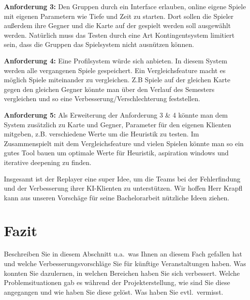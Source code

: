 \documentclass[12pt,a4paper,bibliography=totocnumbered,listof=totocnumbered]{scrartcl}
\begin{document}
	\textbf{Anforderung 3:} Den Gruppen durch ein Interface erlauben, online eigene Spiele mit eigenen Parametern wie Tiefe und Zeit zu starten. Dort sollen die Spieler außerdem ihre Gegner und die Karte auf der gespielt werden soll ausgewählt werden. Natürlich muss das Testen durch eine Art Kontingentsystem limitiert sein, dass die Gruppen das Spielsystem nicht ausnützen können. 
	
	\textbf{Anforderung 4:} Eine Profilsystem würde sich anbieten. In diesem System werden alle vergangenen Spiele gespeichert. Ein Vergleichsfeature macht es möglich Spiele miteinander zu vergleichen. Z.B Spiele auf der gleichen Karte gegen den gleichen Gegner könnte man über den Verlauf des Semesters vergleichen und so eine Verbesserung/Verschlechterung feststellen.
	
	\textbf{Anforderung 5:} Als Erweiterung der Anforderung 3 \& 4 könnte man dem System zusätzlich zu Karte und Gegner, Parameter für den eigenen Klienten mitgeben, z.B. verschiedene Werte um die Heuristik zu testen. Im Zusammenspielt mit dem Vergleichsfeature und vielen Spielen könnte man so ein gutes Tool bauen um optimale Werte für Heuristik, aspiration windows und iterative deepening zu finden.
	
	Insgesamt ist der Replayer eine super Idee, um die Teams bei der Fehlerfindung und der Verbesserung ihrer KI-Klienten zu unterstützen. Wir hoffen Herr Krapfl kann aus unseren Vorschäge für seine Bachelorarbeit nützliche Ideen ziehen.
	
    \newpage
    \section{Fazit}
    Beschreiben Sie in diesem Abschnitt u.a.\ was Ihnen an diesem Fach gefallen hat und welche Verbesserungsvorschläge Sie für künftige Veranstaltungen haben. Was konnten Sie dazulernen, in welchen Bereichen haben Sie sich verbessert. Welche Problemsituationen gab es während der Projekterstellung, wie sind Sie diese angegangen und wie haben Sie diese gelöst. Was haben Sie evtl.\ vermisst.

    \newpage
    
    
\end{document}
